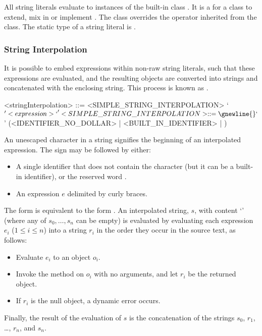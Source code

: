 \documentclass[makeidx]{article}
\begin{document}
{\LMHash{}%
All string literals evaluate to instances of the built-in class .
It is a  for a class to
extend, mix in or implement .
The  class overrides the \lit{==} operator inherited from
the  class.
The static type of a string literal is .


\subsubsection{String Interpolation}

\LMHash{}%
It is possible to embed expressions within non-raw string literals,
such that these expressions are evaluated,
and the resulting objects are converted into strings and
concatenated with the enclosing string.
This process is known as .

\begin{grammar}
<stringInterpolation> ::= <SIMPLE\_STRING\_INTERPOLATION>
  \alt `${' <expression> `}'

<SIMPLE\_STRING\_INTERPOLATION> ::= \gnewline{}
  `$' (<IDENTIFIER\_NO\_DOLLAR> | <BUILT\_IN\_IDENTIFIER> | \THIS)
\end{grammar}


\LMHash{}%
An unescaped \lit{\$} character in a string signifies
the beginning of an interpolated expression.
The \lit{\$} sign may be followed by either:
\begin{itemize}
\item A single identifier \id{} that does not contain the \lit{\$} character
  (but it can be a built-in identifier),
  or the reserved word \THIS.
\item An expression $e$ delimited by curly braces.
\end{itemize}

\LMHash{}%
The form \code{\$\id} is equivalent to the form \code{\$\{\id\}}.
An interpolated string, $s$, with content
`'
(where any of $s_0, \ldots, s_n$ can be empty)
is evaluated by evaluating each expression $e_i$ ($1 \le i \le n$)
into a string $r_i$ in the order they occur in the source text, as follows:
\begin{itemize}
\item Evaluate $e_i$ to an object $o_i$.
\item Invoke the  method on $o_i$ with no arguments,
  and let $r_i$ be the returned object.
\item If $r_i$ is the null object, a dynamic error occurs.
\end{itemize}
Finally, the result of the evaluation of $s$ is
the concatenation of the strings $s_0$, $r_1$, \ldots, $r_n$, and $s_n$.


}
\end{document}
